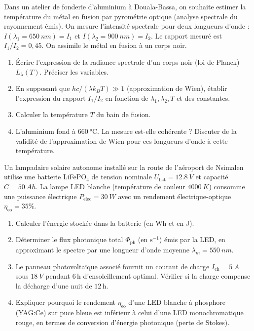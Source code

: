 \documentclass[11pt]{article}
\begin{document}
\begin{exercice}
Dans un atelier de fonderie d'aluminium à Douala-Bassa, on souhaite estimer la température du métal en fusion par pyrométrie optique (analyse spectrale du rayonnement émis). On mesure l'intensité spectrale pour deux longueurs d'onde : $I(\lambda_1 = \SI{650}{nm}) = I_1$ et $I(\lambda_2 = \SI{900}{nm}) = I_2$. Le rapport mesuré est $I_1 / I_2 = 0,45$. On assimile le métal en fusion à un corps noir.
\begin{enumerate}
    \item Écrire l'expression de la radiance spectrale d'un corps noir (loi de Planck) $L_{\lambda}(T)$. Préciser les variables.
    \item En supposant que $hc/(\lambda k_B T) \gg 1$ (approximation de Wien), établir l'expression du rapport $I_1/I_2$ en fonction de $\lambda_1, \lambda_2, T$ et des constantes.
    \item Calculer la température $T$ du bain de fusion.
    \item L'aluminium fond à $\SI{660}{\celsius}$. La mesure est-elle cohérente ? Discuter de la validité de l'approximation de Wien pour ces longueurs d'onde à cette température.
\end{enumerate}
\end{exercice}

\begin{exercice}
Un lampadaire solaire autonome installé sur la route de l'aéroport de Nsimalen utilise une batterie LiFePO$_4$ de tension nominale $U_{\text{bat}} = \SI{12,8}{V}$ et capacité $C = \SI{50}{Ah}$. La lampe LED blanche (température de couleur $\SI{4000}{K}$) consomme une puissance électrique $P_{\text{elec}} = \SI{30}{W}$ avec un rendement électrique-optique $\eta_{\text{eo}} = 35\%$.
\begin{enumerate}
    \item Calculer l'énergie stockée dans la batterie (en Wh et en J).
    \item Déterminer le flux photonique total $\Phi_{\text{ph}}$ (en $\text{s}^{-1}$) émis par la LED, en approximant le spectre par une longueur d'onde moyenne $\lambda_m = \SI{550}{nm}$.
    \item Le panneau photovoltaïque associé fournit un courant de charge $I_{\text{ch}} = \SI{5}{A}$ sous $\SI{18}{V}$ pendant $6\,\text{h}$ d'ensoleillement optimal. Vérifier si la charge compense la décharge d'une nuit de $12\,\text{h}$.
    \item Expliquer pourquoi le rendement $\eta_{\text{eo}}$ d'une LED blanche à phosphore (YAG:Ce) sur puce bleue est inférieur à celui d'une LED monochromatique rouge, en termes de conversion d'énergie photonique (perte de Stokes).
\end{enumerate}
\end{exercice}
\end{document}
